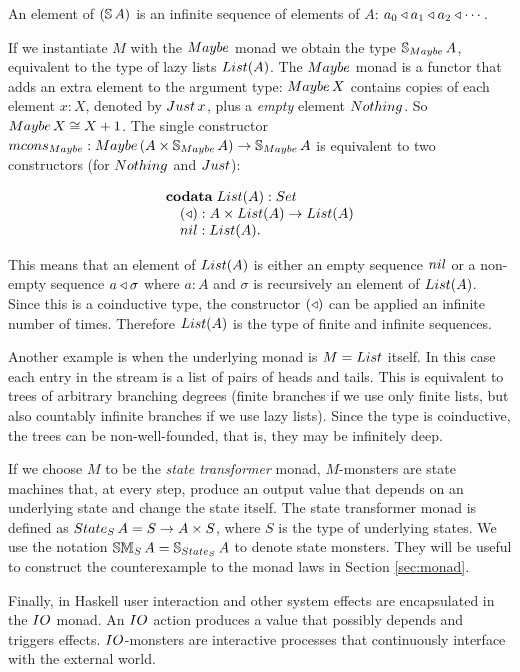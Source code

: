An element of $(\mathbb{S}\,A)$ is an infinite sequence of elements of $A$: $a_0 \triangleleft a_1\triangleleft a_2\triangleleft \cdots$.

If we instantiate $M$ with the $\maybe$ monad we obtain the type $\stream{\maybe}\,A$, equivalent to the type of lazy lists $\lst{A}$.
The $\maybe$ monad is a functor that adds an extra element to the argument type:
$\maybe\,X$ contains copies of each element $x:X$, denoted by $\just\,x$, plus a {\em empty} element $\nothing$.
So $\maybe\,X \cong X+1$.
The single constructor $\mcons_\maybe: \maybe\,(A\times \stream{\maybe}\,A)\rightarrow\stream{\maybe}\,A$ is equivalent to two constructors (for $\nothing$ and $\just$):

$$
\begin{array}[t]{l}
\codata\;
\lst{A}:\set\\
\quad (\scons): A\times \lst{A}\rightarrow\lst{A}\\
\quad \nil: \lst{A}.
\end{array}
$$

This means that an element of $\lst{A}$ is either an empty sequence $\nil$ or a non-empty sequence $a\triangleleft \sigma$ where $a:A$ and $\sigma$ is recursively an element of $\lst{A}$.
Since this is a coinductive type, the constructor $(\triangleleft)$ can be applied an infinite number of times.
Therefore $\lst{A}$ is the type of finite and infinite sequences.

Another example is when the underlying monad is $M = \lstsym $ itself.
In this case each entry in the stream is a list of pairs of heads and tails.
This is equivalent to trees of arbitrary branching degrees (finite branches if we use only finite lists, but also countably infinite branches if we use lazy lists).
Since the type is coinductive, the trees can be non-well-founded, that is, they may be infinitely deep.

If we choose $M$ to be the {\em state transformer} monad, $M$-monsters are state machines that, at every step, produce an output value that depends on an underlying state and change the state itself.
The state transformer monad is defined as $\state_S\,A = S\rightarrow A\times S$, where $S$ is the type of underlying states.
We use the notation $\stmon{S}\,A = \stream{\state_S}\,A$ to denote state monsters.
They will be useful to construct the counterexample to the monad laws in Section \ref{sec:monad}.

Finally, in Haskell user interaction and other system effects are encapsulated in the $\io$ monad. An $\io$ action produces a value that possibly depends and triggers effects. $\io$-monsters are interactive processes that continuously interface with the external world.

